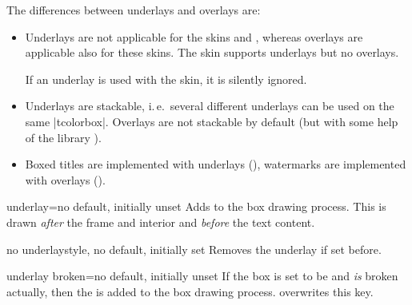The differences between underlays and overlays are:
\begin{itemize}
\item Underlays are not applicable for the skins
   and
  ,
  whereas overlays are applicable also for these skins.
  The skin  supports underlays but no overlays.
  \begin{marker}
  If an underlay is used with the  skin, it is silently ignored.
  \end{marker}
\item Underlays are stackable, i.\,e.\ several different underlays can be
  used on the same |tcolorbox|. Overlays are not stackable by default (but with
  some help of the library ).
\item Boxed titles are implemented with underlays (),
  watermarks are implemented with overlays ().
\end{itemize}


\begin{docTcbKey}{underlay}{=}{no default, initially unset}
  Adds  to the box drawing process. This 
  is drawn \emph{after} the frame and interior and \emph{before} the text content.
\end{docTcbKey}


\begin{docTcbKey}{no underlay}{}{style, no default, initially set}
  Removes the underlay if set before.
\end{docTcbKey}

\clearpage
\begin{docTcbKey}{underlay broken}{=}{no default, initially unset}
  If the box is set to be  and \emph{is} broken actually,
  then the  is added to the box drawing process.
   overwrites this key.
\end{docTcbKey}

